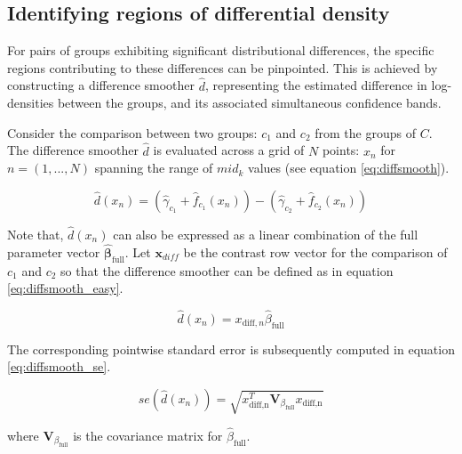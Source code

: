 
\subsection{Identifying regions of differential density}
For pairs of groups exhibiting significant distributional differences, the specific regions contributing to these differences can be pinpointed. This is achieved by constructing a difference smoother $\hat{d}$, representing the estimated difference in log-densities between the groups, and its associated simultaneous confidence bands.

Consider the comparison between two groups: $c_1$ and $c_2$ from the groups of $C$. The difference smoother $\hat{d}$ is evaluated across a grid of $N$ points: $x_n$ for $n = (1,...,N)$ spanning the range of $mid_k$ values (see equation \ref{eq:diffsmooth}).

\begin{equation}
\hat{d}(x_n) = (\hat{\gamma}_{c_1} + \hat{f}_{c_1}(x_n)) - (\hat{\gamma}_{c_2} + \hat{f}_{c_2}(x_n))
\label{eq:diffsmooth}
\end{equation}

Note that, $\hat{d}(x_n)$ can also be expressed as a linear combination of the full parameter vector $\hat{\boldsymbol{\beta}}_{\text{full}}$. Let $\boldsymbol{x}_{diff}$ be the contrast row vector for the comparison of $c_1$ and $c_2$ so that the difference smoother can be defined as in equation \ref{eq:diffsmooth_easy}.

\begin{equation}
\hat{d}(x_n) = x_{\text{diff},n}\hat{\beta}_{\text{full}}
\label{eq:diffsmooth_easy}
\end{equation}

The corresponding pointwise standard error is subsequently computed in equation \ref{eq:diffsmooth_se}.

\begin{equation}
se(\hat{d}(x_n)) = \sqrt{x_{\text{diff,n}}^T\boldsymbol{V}_{\beta_{\text{full}}}x_{\text{diff,n}}}
\label{eq:diffsmooth_se}
\end{equation}

where $\boldsymbol{V}_{\beta_{\text{full}}}$ is the covariance matrix for $\hat{\beta}_{\text{full}}$.

